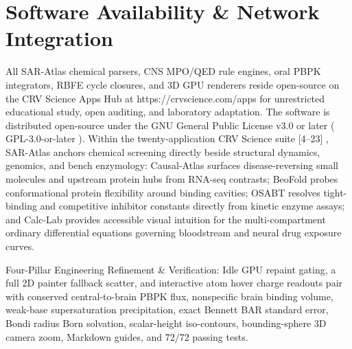 \documentclass[10pt,letterpaper]{article}
\begin{document}
\section{Software Availability \& Network Integration}
All SAR-Atlas chemical parsers, CNS MPO/QED rule engines, oral PBPK integrators, RBFE cycle closures, and 3D GPU renderers reside open-source on the CRV Science Apps Hub at https://crvscience.com/apps for unrestricted educational study, open auditing, and laboratory adaptation. The software is distributed open-source under the GNU General Public License v3.0 or later ( GPL-3.0-or-later ). Within the twenty-application CRV Science suite [4--23] , SAR-Atlas anchors chemical screening directly beside structural dynamics, genomics, and bench enzymology: Causal-Atlas surfaces disease-reversing small molecules and upstream protein hubs from RNA-seq contrasts; BeoFold probes conformational protein flexibility around binding cavities; OSABT resolves tight-binding and competitive inhibitor constants directly from kinetic enzyme assays; and Calc-Lab provides accessible visual intuition for the multi-compartment ordinary differential equations governing bloodstream and neural drug exposure curves.

Four-Pillar Engineering Refinement \& Verification: Idle GPU repaint gating, a full 2D painter fallback scatter, and interactive atom hover charge readouts pair with conserved central-to-brain PBPK flux, nonspecific brain binding volume, weak-base supersaturation precipitation, exact Bennett BAR standard error, Bondi radius Born solvation, scalar-height iso-contours, bounding-sphere 3D camera zoom, Markdown guides, and 72/72 passing tests.
\end{document}
